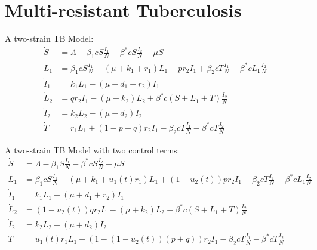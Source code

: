 \section{Multi-resistant Tuberculosis}  %
A two-strain TB Model:
\begin{align*}
	\dot{S}	&= 
    	\Lambda -\beta_{1} cS \frac{I_1}{N} - \beta^{*}cS\frac{I_2}{N} - 
        \mu S 
        \\
    \dot{L}_1 &= 
    	\beta_{1} cS \frac{I_1}{N} - (\mu + k_1 + r_1)L_{1} + pr_2 I_1 + 
        \beta_{2} cT \frac{I_1}{N} - \beta^{*}cL_{1}\frac{I_2}{N}  
        \\
    \dot{I}_1 &=  
    	k_1 L_{1} - (\mu + d_1 + r_2)I_1  
        \\
    \dot{L}_2 &=  
    	q r_2 I_1 - (\mu + k_2)L_2 + \beta^{*}c(S + L_1 + T)\frac{I_2}{N}  
        \\
    \dot{I}_2 &=  
    	k_2 L_2 - (\mu + d_2)I_2  
        \\
    \dot{T} &=  
    	r_1 L_{1} + (1-p-q)r_2 I_1 - \beta_{2} cT \frac{I_1}{N} - 
        \beta^{*}cT\frac{I_2}{N}  
\end{align*}

A two-strain TB Model with two control terms:
\begin{align*}
	\dot{S}	&= 
    	\Lambda -\beta_{1} S \frac{I_1}{N} - \beta^{*}cS\frac{I_2}{N} - 
        \mu S 
        \\
    \dot{L}_1 &= 
    	\beta_{1} cS \frac{I_1}{N} - (\mu + k_1 + u_1(t)r_1)L_{1} + 
        (1 - u_2(t))pr_2 I_1 + \beta_{2} cT \frac{I_1}{N} -
        \beta^{*}cL_{1}\frac{I_2}{N}  
        \\
    \dot{I}_1 &=  
    	k_1 L_{1} - (\mu + d_1 + r_2)I_1  
        \\
    \dot{L}_2 &=  
    	(1 - u_2(t))q r_2 I_1 - (\mu + k_2)L_2 + \beta^{*}c(S + L_1 + 
        T)\frac{I_2}{N}  
        \\
    \dot{I}_2 &=  
    	k_2 L_2 - (\mu + d_2)I_2  
        \\
    \dot{T} &=  
    	u_1(t)r_1 L_{1} + (1-(1-u_2(t))(p+q))r_2 I_1 - \beta_{2} cT \frac{I_1}{N} - 
        \beta^{*}cT\frac{I_2}{N}  
\end{align*}


